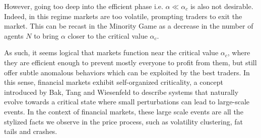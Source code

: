 \documentclass[a4paper, amsfonts, amssymb, amsmath, reprint, showkeys, nofootinbib, twoside]{revtex4-1}
\begin{document}
However, going too deep into the efficient phase i.e. $\alpha \ll \alpha_c$ is also not desirable. Indeed, in this regime markets are too volatile, prompting traders to exit the market. This can be recast in the Minority Game as a decrease in the number of agents $N$ to bring $\alpha$ closer to the critical value $\alpha_c$.

As such, it seems logical that markets function near the critical value $\alpha_c$, where they are efficient enough to prevent mostly everyone to profit from them, but still offer subtle anomalous behaviors which can be exploited by the best traders. In this sense, financial markets exhibit self-organized criticality, a concept introduced by Bak, Tang and Wiesenfeld \cite{Bak_1987} to describe systems that naturally evolve towards a critical state where small perturbations can lead to large-scale events. In the context of financial markets, these large scale events are all the stylized facts we observe in the price process, such as volatility clustering, fat tails and crashes.


\end{document}
